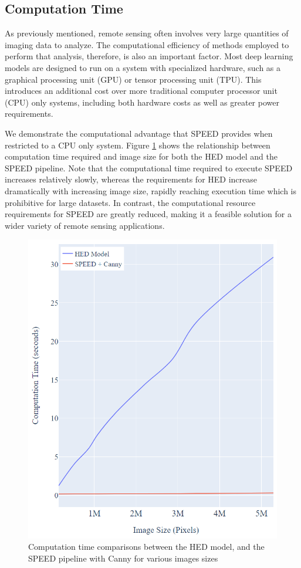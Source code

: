 \documentclass[conference]{IEEEtran}
\begin{document}
\subsection{Computation Time}
\label{subsec:TimePerformance}

As previously mentioned, remote sensing often involves very large quantities of imaging data to analyze. The computational efficiency of methods employed to perform that analysis, therefore, is also an important factor. Most deep learning models are designed to run on a system with specialized hardware, such as a graphical processing unit (GPU) or tensor processing unit (TPU). This introduces an additional cost over more traditional computer processor unit (CPU) only systems, including both hardware costs as well as greater power requirements.

We demonstrate the computational advantage that SPEED provides when restricted to a CPU only system. Figure \ref{fig:timeAnalysis} shows the relationship between computation time required and image size for both the HED model and the SPEED pipeline. Note that the computational time required to execute SPEED increases relatively slowly, whereas the requirements for HED increase dramatically with increasing image size, rapidly reaching execution time which is prohibitive for large datasets. In contrast, the computational resource requirements for SPEED are greatly reduced, making it a feasible solution for a wider variety of remote sensing applications.

\begin{figure}
\centerline{\includegraphics[width=0.8\linewidth]{time_analysis.PNG}}
\caption{Computation time comparisons between the HED model, and the SPEED pipeline with Canny for various images sizes}
\label{fig:timeAnalysis}
\end{figure}
\end{document}
